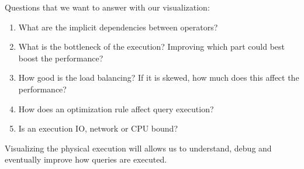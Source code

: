 \documentclass[12pt]{article}
\begin{document}
\vspace{10px}

\noindent Questions that we want to answer with our visualization:

\begin{enumerate}
	\item What are the implicit dependencies between operators?
	\item What is the bottleneck of the execution? Improving which part could best boost the performance?
	\item How good is the load balancing? If it is skewed, how much does this affect the performance?
	\item How does an optimization rule affect query execution?
	\item Is an execution IO, network or CPU bound?
\end{enumerate}

Visualizing the physical execution will allows us to understand, debug and eventually improve how queries are executed.
\end{document}

